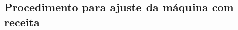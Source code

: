 \ifmachineType
\else
  \newpage
  \thispagestyle{fancy}
  \vspace*{40 pt}
\fi

\subsection{Procedimento para ajuste da máquina com receita}


\begin{procedureAdjustmentRecipe}
  

\end{procedureAdjustmentRecipe}
